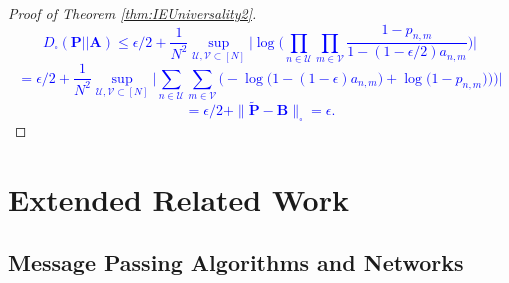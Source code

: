 \documentclass{article}
\theoremstyle{plain}
\theoremstyle{definition}
\theoremstyle{remark}
\newcommand{\dan}[1]{{{\textcolor{blue}{ {#1}\textbf{}}}}}
\begin{document}
\begin{proof}[Proof of Theorem \ref{thm:IEUniversality2}]
\dan{
\[D_{\square}(\mathbf{P}||\mathbf{A}) \leq \epsilon/2+\frac{1}{N^2}\sup_{\mathcal{U},\mathcal{V}\subset[N]}\Big|\log\Big(\prod_{n\in \mathcal{U}}\prod_{m\in \mathcal{V}}
\frac{1-p_{n,m}}{1-(1-\epsilon/2)a_{n,m}}\Big)\Big|\]
\[ =
\epsilon/2+\frac{1}{N^2}\sup_{\mathcal{U},\mathcal{V}\subset[N]}\Big|\sum_{n\in \mathcal{U}}\sum_{m\in \mathcal{V}}\Big(-\log\big(1-(1-\epsilon)a_{n,m}\big) + \log\big(1-p_{n,m})\big)\Big)\Big|\]
\[=\epsilon/2 + \| \tilde{\mathbf{P}}-\mathbf{B} \|_{\square} = \epsilon. \]
}


  
\end{proof}





















\section{Extended Related Work}
\label{Extended Related Work}





\subsection{Message Passing Algorithms and Networks}


\end{document}
